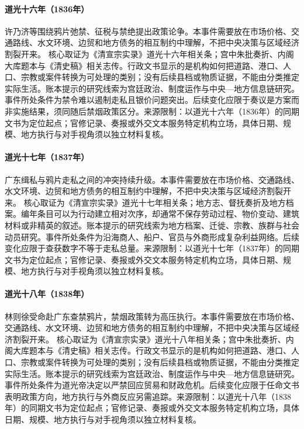 \hypertarget{civic:EQ-1836-OPIUM-LEGALIZATION-DEBATE}{}\paragraph{道光十六年（1836年）}许乃济等围绕鸦片弛禁、征税与禁绝提出政策论争。本事件需要放在市场价格、交通路线、水文环境、边贸和地方债务的相互制约中理解，不把中央决策与区域经济割裂开来。 核心取证为《清宣宗实录》道光十六年相关条；宫中朱批奏折、内阁大库题本与《清史稿》相关志传。行政文书显示的是机构如何把道路、港口、人口、宗教或案件转换为可处理的类别；没有后续县档或物质证据，不能由分类推定实际生活。账本提示的研究线索为宫廷政治、制度运作与中央—地方信息链研究。事件所处条件为禁令难以遏制走私且银价问题突出。后续变化应限于奏议是方案而非实施结果，须同随后禁烟政策区分。来源限制：以道光十六年（1836年）的同期文书为定位起点；官修记录、奏报或外交文本服务特定机构立场，具体日期、规模、地方执行与对手视角须以独立材料复核。
\hypertarget{civic:EQ-1837-CANTON-SMUGGLING}{}\paragraph{道光十七年（1837年）}广东缉私与鸦片走私之间的冲突持续升级。本事件需要放在市场价格、交通路线、水文环境、边贸和地方债务的相互制约中理解，不把中央决策与区域经济割裂开来。 核心取证为《清宣宗实录》道光十七年相关条；地方志、督抚奏折及地方档案。编年条目可以为行动建立相对次序，却通常不保存劳动过程、物价变动、建筑材料或非精英的叙述。账本提示的研究线索为地方档案、迁徙、宗教、族群与社会动员研究。事件所处条件为沿海商人、船户、官员与外商形成复杂利益网络。后续变化应限于查获数字不等于走私总量。来源限制：以道光十七年（1837年）的同期文书为定位起点；官修记录、奏报或外交文本服务特定机构立场，具体日期、规模、地方执行与对手视角须以独立材料复核。
\hypertarget{civic:EQ-1838-LIN-ZEXU-APPOINTMENT}{}\paragraph{道光十八年（1838年）}林则徐受命赴广东查禁鸦片，禁烟政策转为高压执行。本事件需要放在市场价格、交通路线、水文环境、边贸和地方债务的相互制约中理解，不把中央决策与区域经济割裂开来。 核心取证为《清宣宗实录》道光十八年相关条；宫中朱批奏折、内阁大库题本与《清史稿》相关志传。行政文书显示的是机构如何把道路、港口、人口、宗教或案件转换为可处理的类别；没有后续县档或物质证据，不能由分类推定实际生活。账本提示的研究线索为宫廷政治、制度运作与中央—地方信息链研究。事件所处条件为道光帝决定以严禁回应贸易和财政危机。后续变化应限于任命文书表明政策方向，地方执行与外商反应另需追踪。来源限制：以道光十八年（1838年）的同期文书为定位起点；官修记录、奏报或外交文本服务特定机构立场，具体日期、规模、地方执行与对手视角须以独立材料复核。
